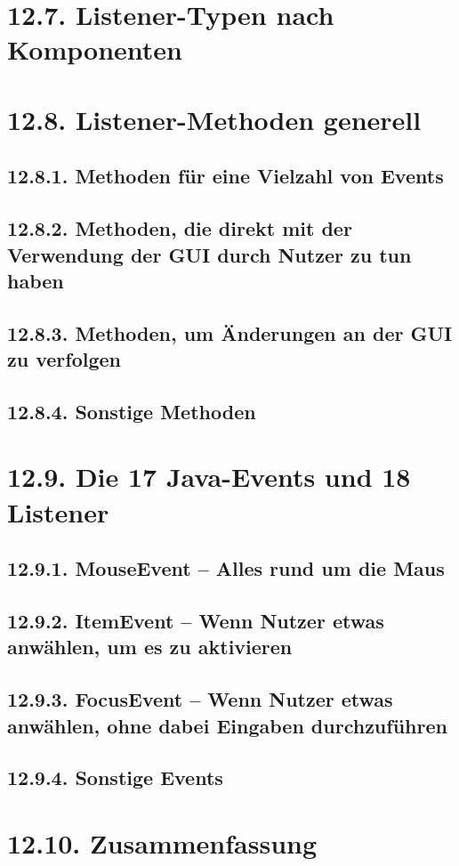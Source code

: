 \section{12.7.	Listener-Typen nach Komponenten}
\section{12.8.	Listener-Methoden generell}
\subsection{12.8.1.	Methoden für eine Vielzahl von Events}
\subsection{12.8.2.	Methoden, die direkt mit der Verwendung der GUI durch Nutzer zu tun haben}
\subsection{12.8.3.	Methoden, um Änderungen an der GUI zu verfolgen}
\subsection{12.8.4.	Sonstige Methoden}
\section{12.9.	Die 17 Java-Events und 18 Listener}
\subsection{12.9.1.	MouseEvent – Alles rund um die Maus}
\subsection{12.9.2.	ItemEvent – Wenn Nutzer etwas anwählen, um es zu aktivieren}
\subsection{12.9.3.	FocusEvent – Wenn Nutzer etwas anwählen, ohne dabei Eingaben durchzuführen}
\subsection{12.9.4.	Sonstige Events}
\section{12.10.	Zusammenfassung}
